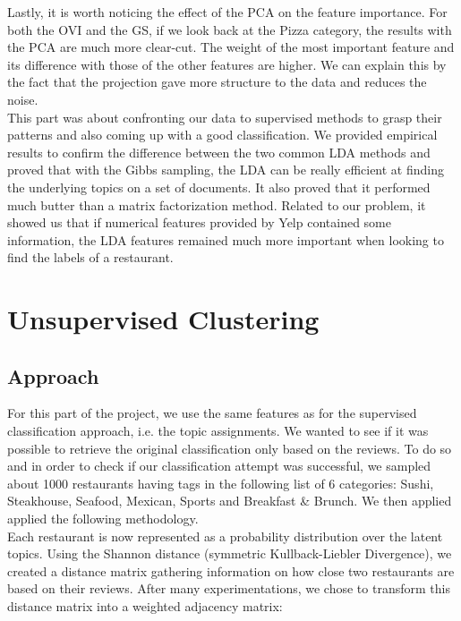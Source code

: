 \documentclass[twoside]{article}
\begin{document}
\begin{multicols}{2}
\noindent Lastly, it is worth noticing the effect of the PCA on the feature importance. For both the OVI and the GS, if we look back at the Pizza category, the results with the PCA are much more clear-cut. The weight of the most important feature and its difference with those of the other features are higher. We can explain this by the fact that the projection gave more structure to the data and reduces the noise.\\

\noindent This part was about confronting our data to supervised methods to grasp their patterns and also coming up with a good classification. We provided empirical results to confirm the difference between the two common LDA methods and proved that with the Gibbs sampling, the LDA can be really efficient at finding the underlying topics on a set of documents.  It also proved that it performed much butter than a matrix factorization method. Related to our problem, it showed us that if numerical features provided by Yelp contained some information, the LDA features remained much more important when looking to find the labels of a restaurant.

\section{Unsupervised Clustering}
\subsection{Approach}

For this part of the project, we use the same features as for the supervised classification approach, i.e. the topic assignments. We wanted to see if it was possible to retrieve the original classification only based on the reviews. To do so and in order to check if our classification attempt was successful, we sampled about 1000 restaurants having tags in the following list of 6 categories: Sushi, Steakhouse, Seafood, Mexican, Sports and Breakfast \& Brunch. We then applied applied the following methodology.\\

Each restaurant is now represented as a probability distribution over the latent topics. Using the Shannon distance (symmetric Kullback-Liebler Divergence), we created a distance matrix gathering information on how close two restaurants are based on their reviews. After many experimentations, we chose to transform this distance matrix into a weighted adjacency matrix:\\


\end{multicols}
\end{document}
